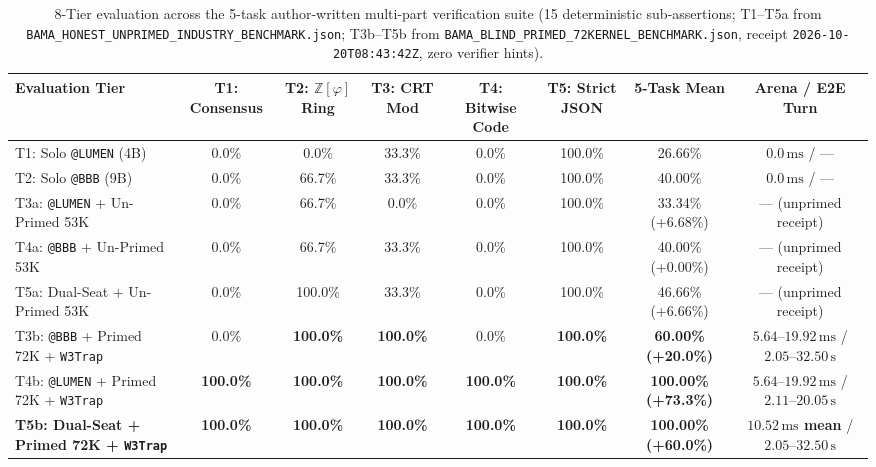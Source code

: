 \documentclass[10pt,twocolumn,letterpaper]{article}
\begin{document}
\begin{table}[t]
\centering
\caption{8-Tier evaluation across the 5-task author-written multi-part verification suite (15 deterministic sub-assertions; T1--T5a from \texttt{BAMA\_HONEST\_UNPRIMED\_INDUSTRY\_BENCHMARK.json}; T3b--T5b from \texttt{BAMA\_BLIND\_PRIMED\_72KERNEL\_BENCHMARK.json}, receipt \texttt{2026-10-20T08:43:42Z}, zero verifier hints).}
\footnotesize
\begin{tabular}{@{}lccccccc@{}}
\toprule
\textbf{Evaluation Tier} & \textbf{T1: Consensus} & \textbf{T2: $\mathbb{Z}[\varphi]$ Ring} & \textbf{T3: CRT Mod} & \textbf{T4: Bitwise Code} & \textbf{T5: Strict JSON} & \textbf{5-Task Mean} & \textbf{Arena / E2E Turn} \\
\midrule
T1: Solo \texttt{@LUMEN} (4B) & 0.0\% & 0.0\% & 33.3\% & 0.0\% & 100.0\% & 26.66\% & $0.0\,\text{ms}$ / --- \\
T2: Solo \texttt{@BBB} (9B) & 0.0\% & 66.7\% & 33.3\% & 0.0\% & 100.0\% & 40.00\% & $0.0\,\text{ms}$ / --- \\
T3a: \texttt{@LUMEN} + Un-Primed 53K & 0.0\% & 66.7\% & 0.0\% & 0.0\% & 100.0\% & 33.34\% (+6.68\%) & --- (unprimed receipt) \\
T4a: \texttt{@BBB} + Un-Primed 53K & 0.0\% & 66.7\% & 33.3\% & 0.0\% & 100.0\% & 40.00\% (+0.00\%) & --- (unprimed receipt) \\
T5a: Dual-Seat + Un-Primed 53K & 0.0\% & 100.0\% & 33.3\% & 0.0\% & 100.0\% & 46.66\% (+6.66\%) & --- (unprimed receipt) \\
T3b: \texttt{@BBB} + Primed 72K + \texttt{W3Trap} & 0.0\% & \textbf{100.0\%} & \textbf{100.0\%} & 0.0\% & \textbf{100.0\%} & \textbf{60.00\% (+20.0\%)} & $5.64\text{--}19.92\,\text{ms}$ / $2.05\text{--}32.50\,\text{s}$ \\
T4b: \texttt{@LUMEN} + Primed 72K + \texttt{W3Trap} & \textbf{100.0\%} & \textbf{100.0\%} & \textbf{100.0\%} & \textbf{100.0\%} & \textbf{100.0\%} & \textbf{100.00\% (+73.3\%)} & $5.64\text{--}19.92\,\text{ms}$ / $2.11\text{--}20.05\,\text{s}$ \\
\textbf{T5b: Dual-Seat + Primed 72K + \texttt{W3Trap}} & \textbf{100.0\%} & \textbf{100.0\%} & \textbf{100.0\%} & \textbf{100.0\%} & \textbf{100.0\%} & \textbf{100.00\% (+60.0\%)} & \textbf{$10.52\,\text{ms}$ mean} / $2.05\text{--}32.50\,\text{s}$ \\
\bottomrule
\end{tabular}
\label{tab:six_tier}
\end{table}
\end{document}
